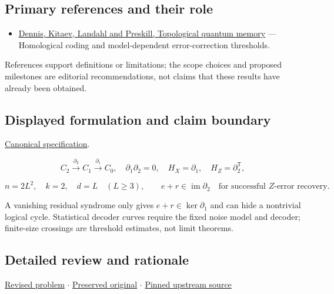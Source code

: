 \documentclass[
  11pt,
]{article}
\providecommand{\tightlist}{%
  \setlength{\itemsep}{0pt}\setlength{\parskip}{0pt}}
\begin{document}
\subsection{Primary references and their role}

\begin{itemize}
\tightlist
\item
  \href{https://arxiv.org/abs/quant-ph/0110143}{Dennis, Kitaev, Landahl
  and Preskill, Topological quantum memory} --- Homological coding and
  model-dependent error-correction thresholds.
\end{itemize}

References support definitions or limitations; the scope choices and
proposed milestones are editorial recommendations, not claims that these
results have already been obtained.

\subsection{Displayed formulation and claim boundary}

\href{https://github.com/rick-stevens-ai/Pure-Thought/blob/main/PRDs/24-Topological-Quantum-Error-Correction.md}{Canonical
specification}.

\[C_2\xrightarrow{\partial_2}C_1\xrightarrow{\partial_1}C_0,
\quad\partial_1\partial_2=0,\quad H_X=\partial_1,\quad H_Z=\partial_2^{\mathsf T},\]

\[n=2L^2,\quad k=2,\quad d=L\quad(L\ge3),\qquad
e+r\in\operatorname{im}\partial_2\quad\text{for successful }Z\text{-error recovery}.\]

A vanishing residual syndrome only gives \(e+r\in\ker\partial_1\) and
can hide a nontrivial logical cycle. Statistical decoder curves require
the fixed noise model and decoder; finite-size crossings are threshold
estimates, not limit theorems.

\subsection{Detailed review and rationale}

\href{https://github.com/rick-stevens-ai/Pure-Thought/blob/main/PRDs/24-Topological-Quantum-Error-Correction.md}{Revised
problem} \ensuremath{\cdot}
\href{https://github.com/rick-stevens-ai/Pure-Thought/blob/main/archive/original-PRDs/24-Topological-Quantum-Error-Correction.md}{Preserved
original} \ensuremath{\cdot}
\href{https://github.com/rick-stevens-ai/Pure-Thought/blob/f854d4e12b55c1f5b5c2a964b75f2d23496d981e/PRDs/24-Topological-Quantum-Error-Correction.md}{Pinned
upstream source}
\end{document}
